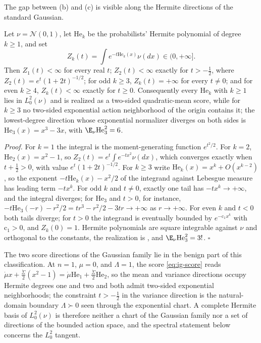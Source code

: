 \medskip
The gap between (b) and (c) is visible along the Hermite directions of the standard
Gaussian.

Let \(\nu=\mathcal N(0,1)\), let \(\mathrm{He}_k\) be the probabilists' Hermite polynomial
of degree \(k\geq1\), and set
\begin{equation}
Z_k(t)=\int e^{-t\mathrm{He}_k(x)}\nu(dx)\in(0,+\infty].
\label{eq:ig-hermite-normalizer}
\end{equation}
Then \(Z_1(t)<\infty\) for every real \(t\); \(Z_2(t)<\infty\) exactly for
\(t>-\tfrac12\), where \(Z_2(t)=e^t(1+2t)^{-1/2}\); for odd \(k\geq3\),
\(Z_k(t)=+\infty\) for every \(t\neq0\); and for even \(k\geq4\),
\(Z_k(t)<\infty\) exactly for \(t\geq0\). Consequently every \(\mathrm{He}_k\) with
\(k\geq1\) lies in \(L^2_0(\nu)\) and is realized as a two-sided quadratic-mean score,
while for \(k\geq3\) no two-sided exponential action neighborhood of the origin contains
it; the lowest-degree direction whose exponential normalizer diverges on both sides is
\(\mathrm{He}_3(x)=x^3-3x\), with \(\E_\nu\mathrm{He}_3^2=6\). 

\noindent\emph{Proof.}
For \(k=1\) the integral is the moment-generating function \(e^{t^2/2}\). For \(k=2\),
\(\mathrm{He}_2(x)=x^2-1\), so \(Z_2(t)=e^t\int e^{-tx^2}\nu(dx)\), which converges
exactly when \(t+\tfrac12>0\), with value \(e^t(1+2t)^{-1/2}\). For \(k\geq3\) write
\(\mathrm{He}_k(x)=x^k+O(x^{k-2})\), so the exponent \(-t\mathrm{He}_k(x)-x^2/2\) of the
integrand against Lebesgue measure has leading term \(-tx^k\). For odd \(k\) and
\(t\neq0\), exactly one tail has \(-tx^k\to+\infty\), and the integral diverges; for
\(\mathrm{He}_3\) and \(t>0\), for instance, \(-t\mathrm{He}_3(-r)-r^2/2=tr^3-r^2/2-3tr\to+\infty\)
as \(r\to+\infty\). For even \(k\) and \(t<0\) both tails diverge; for \(t>0\) the
integrand is eventually bounded by \(e^{-\mathrm c_1x^k}\) with \(\mathrm c_1>0\), and
\(Z_k(0)=1\). Hermite polynomials are square integrable against \(\nu\) and
orthogonal to the constants, the realization is , and
\(\E_\nu\mathrm{He}_3^2=3!\). \hfill$\square$

\medskip
The two score directions of the Gaussian family lie in the benign part of this
classification. At \(n=1\), \(\mu=0\), and \(\Lambda=1\), the score \eqref{eq:ig-score}
reads \(\dot\mu x+\tfrac{\dot\Sigma}2(x^2-1)=\dot\mu\mathrm{He}_1+\tfrac{\dot\Sigma}2\mathrm{He}_2\),
so the mean and variance directions occupy Hermite degrees one and two and both admit
two-sided exponential neighborhoods; the constraint \(t>-\tfrac12\) in the variance
direction is the natural-domain boundary \(\Lambda\succ0\) seen through the exponential
chart. A complete Hermite basis of \(L^2_0(\nu)\) is therefore neither a chart of the
Gaussian family nor a set of directions of the bounded action space, and the spectral
statement below concerns the \(L^2_0\) tangent.

